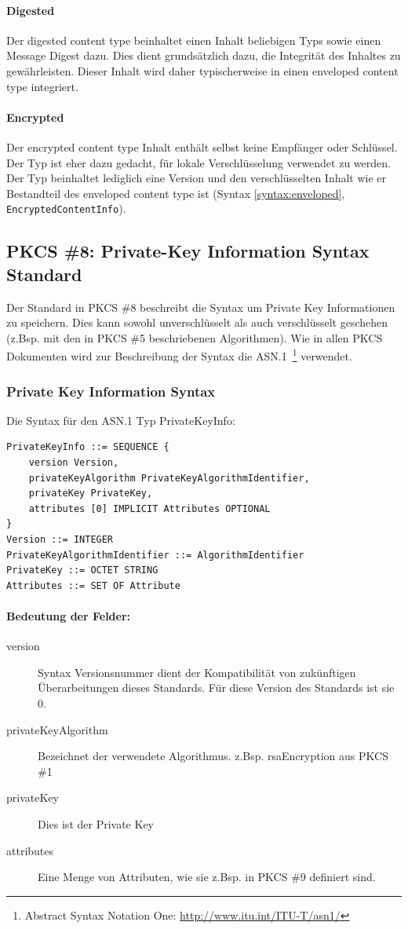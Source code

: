 \documentclass[10pt,a4paper]{article}
\begin{document}
\paragraph{Digested}
Der digested content type beinhaltet einen Inhalt beliebigen Typs sowie einen Message
Digest dazu. Dies dient grundsätzlich dazu, die Integrität des Inhaltes zu gewährleisten.
Dieser Inhalt wird daher typischerweise in einen enveloped content type integriert.

\paragraph{Encrypted}
Der encrypted content type Inhalt enthält selbst keine Empfänger oder Schlüssel. Der Typ
ist eher dazu gedacht, für lokale Verschlüsselung verwendet zu werden. Der Typ beinhaltet
lediglich eine Version und den verschlüsselten Inhalt wie er Bestandteil des enveloped
content type ist (Syntax \ref{syntax:enveloped}, \texttt{EncryptedContentInfo}).

\subsection{PKCS \#8: Private-Key Information Syntax Standard}
Der Standard in PKCS \#8 beschreibt die Syntax um Private Key Informationen zu speichern.
Dies kann sowohl unverschlüsselt als auch verschlüsselt geschehen (z.Bsp. mit den in PKCS
\#5 beschriebenen Algorithmen). Wie in allen PKCS Dokumenten wird zur Beschreibung der
Syntax die ASN.1~\footnote{Abstract Syntax Notation One:
\url{http://www.itu.int/ITU-T/asn1/}} verwendet.

\subsubsection{Private Key Information Syntax}
Die Syntax für den ASN.1 Typ PrivateKeyInfo:
\begin{verbatim}
PrivateKeyInfo ::= SEQUENCE {
    version Version,
    privateKeyAlgorithm PrivateKeyAlgorithmIdentifier,
    privateKey PrivateKey,
    attributes [0] IMPLICIT Attributes OPTIONAL
}
Version ::= INTEGER
PrivateKeyAlgorithmIdentifier ::= AlgorithmIdentifier
PrivateKey ::= OCTET STRING
Attributes ::= SET OF Attribute
\end{verbatim}

\paragraph{Bedeutung der Felder:}
\begin{description}
    \item[version] Syntax Versionsnummer dient der Kompatibilität von zukünftigen
        Überarbeitungen dieses Standards. Für diese Version des Standards ist sie 0.
    \item[privateKeyAlgorithm] Bezeichnet der verwendete Algorithmus. z.Bsp. rsaEncryption
        aus PKCS \#1
    \item[privateKey] Dies ist der Private Key
    \item[attributes] Eine Menge von Attributen, wie sie z.Bsp. in PKCS \#9 definiert
        sind.
\end{description}
\end{document}
